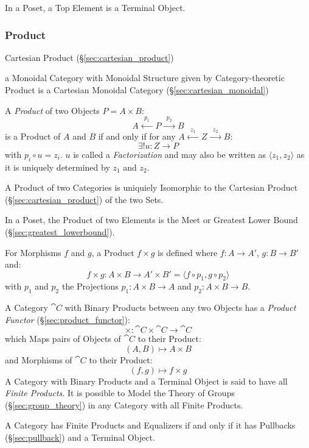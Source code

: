 In a Poset, a Top Element is a Terminal Object.



\subsubsection{Product}\label{sec:product}

\fist Cartesian Product (\S\ref{sec:cartesian_product})

a Monoidal Category with Monoidal Structure given by Category-theoretic Product
is a Cartesian Monoidal Category (\S\ref{sec:cartesian_monoidal})

A \emph{Product} of two Objects $P = A \times B$:
\[
  A \xleftarrow{\;\;p_1\;\;} P \xrightarrow{\;\;p_2\;\;} B
\]
is a Product of $A$ and $B$ if and only if for any $A
\xleftarrow{\;\;z_1\;\;} Z \xrightarrow{\;\;z_2\;\;} B$:
\[
  \exists!u : Z \rightarrow P
\]
with $p_i \circ u = z_i$. $u$ is called a \emph{Factorization} and may
also be written as $\langle z_1, z_2 \rangle$ as it is uniquely
determined by $z_1$ and $z_2$.

A Product of two Categories is uniquiely Isomorphic to the Cartesian
Product (\S\ref{sec:cartesian_product}) of the two Sets.

In a Poset, the Product of two Elements is the Meet or Greatest Lower
Bound (\S\ref{sec:greatest_lowerbound}).

For Morphisms $f$ and $g$, a Product $f \times g$ is defined where $f
: A \rightarrow A'$, $g : B \rightarrow B'$ and:
\[
  f \times g : A \times B \rightarrow A' \times B' =
  \langle f \circ p_1, g \circ p_2 \rangle
\]
with $p_1$ and $p_2$ the Projections $p_1 : A \times B \rightarrow A$
and $p_2 : A \times B \rightarrow B$.

A Category $\cat{C}$ with Binary Products between any two Objects
has a \emph{Product Functor} (\S\ref{sec:product_functor}):
\[
  \times : \cat{C} \times \cat{C} \rightarrow \cat{C}
\]
which Maps pairs of Objects of $\cat{C}$ to their Product:
\[
  (A,B) \mapsto A \times B
\]
and Morphisms of $\cat{C}$ to their Product:
\[
  (f,g) \mapsto f \times g
\]
A Category with Binary Products and a Terminal Object is said to have
all \emph{Finite Products}. It is possible to Model the Theory of
Groups (\S\ref{sec:group_theory}) in any Category with all Finite
Products.

A Category has Finite Products and Equalizers if and only if it has
Pullbacks (\S\ref{sec:pullback}) and a Terminal Object. \cite{awodey06}

